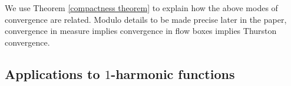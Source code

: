\documentclass[reqno,11pt]{amsart}
\newcommand{\Sph}{\mathbf S}
\newcommand*\dif{\mathop{}\!\mathrm{d}}
\newcommand{\Lip}{\mathrm{Lip}}
\newcommand{\dfn}[1]{\emph{#1}\index{#1}}
\theoremstyle{definition}
\numberwithin{equation}{section}
\begin{document}
We use Theorem \ref{compactness theorem} to explain how the above modes of convergence are related.
Modulo details to be made precise later in the paper, convergence in measure implies convergence in flow boxes implies Thurston convergence.

\subsection{Applications to \texorpdfstring{$1$-harmonic}{one-harmonic} functions}\label{FLG section}
\end{document}
